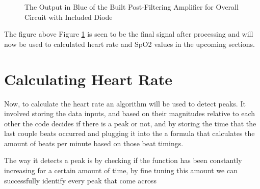 \documentclass{article}
\begin{document}
\begin{figure}[h]
    \centering
    \caption{The Output in Blue of the Built Post-Filtering Amplifier for Overall Circuit with Included Diode}
    \label{figure:Post-FilterAmpBuilt_O}
\end{figure}

The figure above Figure \ref{figure:Post-FilterAmpBuilt_O} is seen to be the final signal after processing and will now be used to calculated heart rate and SpO2 values in the upcoming sections.

\newpage
\section{Calculating Heart Rate}
Now, to calculate the heart rate an algorithm will be used to detect peaks. It involved storing the data inputs, and based on their magnitudes relative to each other the code decides if there is a peak or not, and by storing the time that the last couple beats occurred and plugging it into the a formula that calculates the amount of beats per minute based on those beat timings.

The way it detects a peak is by checking if the function has been constantly increasing for a certain amount of time, by fine tuning this amount we can successfully identify every peak that come across
\end{document}
